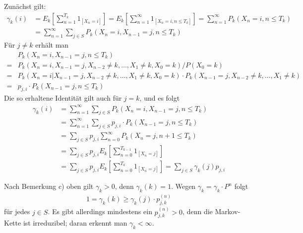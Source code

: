 \documentclass[a4paper,twoside,DIV15,BCOR12mm]{scrbook}
\begin{document}
\begin{beweis}
\begin{enuma}
\item Zunächst gilt:
  \begin{align*}
      \gamma_k(i)
    &= E_k[\sum_{n=1}^{T_k} 1_{[X_n = i]}]
     = E_k[\sum_{n=1}^\infty 1_{[X_n = i, n \leq T_k]}]
     = \sum_{n=1}^\infty P_k(X_n = i, n \leq T_k)\\
    &= \sum_{n=1}^\infty \sum_{j \in S} P_k(X_n = i, X_{n-1} = j, n \leq T_k)
  \end{align*}
  Für $j \neq k$ erhält man
  \begin{align*}
      &P_k(X_n = i, X_{n-1} = j, n \leq T_k)\\
    = &P_k(X_n = i, X_{n-1} = j, X_{n-2} \neq k, \ldots, X_1 \neq k, X_0 = k) / P(X_0 = k)\\
    = &P_k(X_n = i | X_{n-1} = j, X_{n-2} \neq k, \ldots, X_1 \neq k, X_0 = k) \cdot P_k(X_{n-1} = j, X_{n-2} \neq k, \ldots, X_1 \neq k)\\
    = &p_{j,i} \cdot P_k(X_{n-1} = j, n \leq T_k)
  \end{align*}
  Die so erhaltene Identität gilt auch für $j = k$, und es folgt
  \begin{align*}
    \gamma_k(i) &= \sum_{n=1}^\infty \sum_{j \in S} P_k(X_n = i, X_{n-1} = j, n \leq T_k)\\
                &= \sum_{n=1}^\infty \sum_{j \in S} p_{j,i} \cdot P_k(X_{n-1} = j, n \leq T_k)\\
                &= \sum_{j \in S} p_{j,i} \sum_{n=0}^\infty P_k(X_n = j, n+1 \leq T_k)\\
                &= \sum_{j \in S} p_{j,i} E_k[\sum_{n=0}^{T_{k-1}} 1_{[X_n = j]}]\\
                &= \sum_{j \in S} p_{j,i} E_k[\sum_{n=0}^{T_k} 1_{[X_n = j]}]
                 = \sum_{j \in S} \gamma_k(j) p_{j,i}
  \end{align*}

\item
  Nach Bemerkung c) oben gilt $\gamma_k > 0$, denn $\gamma_k(k) = 1$. Wegen $\gamma_k = \gamma_k \cdot P^n$ folgt
  \begin{align*}
    1 = \gamma_k(k) \geq \gamma_k(j) \cdot p_{j,k}^{(n)}
  \end{align*}
  für jedes $j \in S$. Es gibt allerdings mindestens ein $p_{j,k}^{(n)} > 0$, denn die Markov-Kette ist irreduzibel; daran erkennt man
  $\gamma_k < \infty$.


\end{enuma}
\end{beweis}
\end{document}
